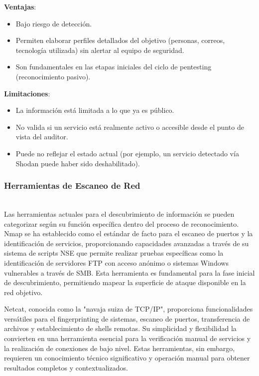 \documentclass[runningheads]{llncs}
\begin{document}
\textbf{Ventajas}:
\begin{itemize}

\item Bajo riesgo de detección.

\item Permiten elaborar perfiles detallados del objetivo (personas, correos, tecnología utilizada) sin alertar al equipo de seguridad.

\item Son fundamentales en las etapas iniciales del ciclo de pentesting (reconocimiento pasivo).

\end{itemize}

\textbf{Limitaciones}:
\begin{itemize}

\item La información está limitada a lo que ya es público.

\item No valida si un servicio está realmente activo o accesible desde el punto de vista del auditor.

\item Puede no reflejar el estado actual (por ejemplo, un servicio detectado vía Shodan puede haber sido deshabilitado).

\end{itemize}

\subsubsection{Herramientas de Escaneo de Red}
\hfill\\

Las herramientas actuales para el descubrimiento de información se pueden categorizar según su función específica dentro del proceso de reconocimiento. Nmap se ha establecido como el estándar de facto para el escaneo de puertos y la identificación de servicios, proporcionando capacidades avanzadas a través de su sistema de scripts NSE que permite realizar pruebas específicas como la identificación de servidores FTP con acceso anónimo o sistemas Windows vulnerables a través de SMB. Esta herramienta es fundamental para la fase inicial de descubrimiento, permitiendo mapear la superficie de ataque disponible en la red objetivo.

Netcat, conocida como la "navaja suiza de TCP/IP", proporciona funcionalidades versátiles para el fingerprinting de sistemas, escaneo de puertos, transferencia de archivos y establecimiento de shells remotas. Su simplicidad y flexibilidad la convierten en una herramienta esencial para la verificación manual de servicios y la realización de conexiones de bajo nivel. Estas herramientas, sin embargo, requieren un conocimiento técnico significativo y operación manual para obtener resultados completos y contextualizados.
\end{document}
